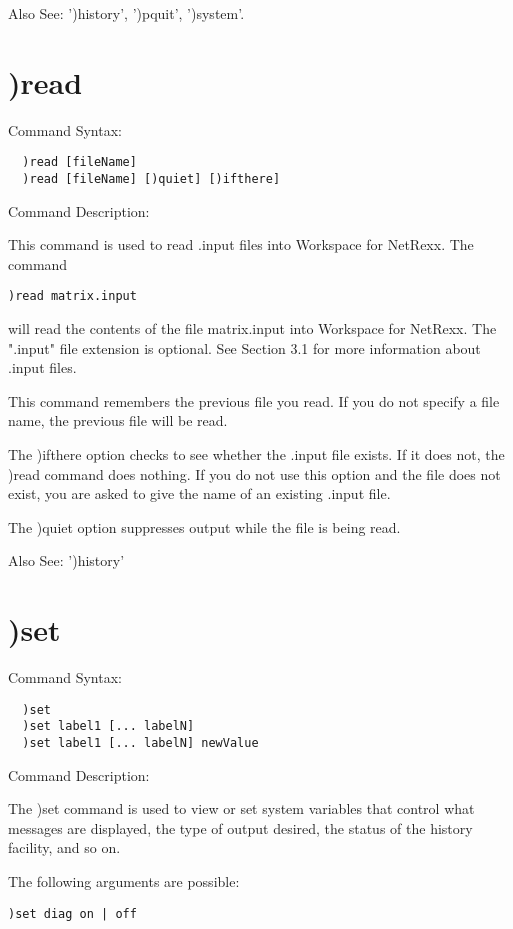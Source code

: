Also See: ')history', ')pquit', ')system'.

\section{)read}

Command Syntax:
\begin{verbatim}
  )read [fileName]
  )read [fileName] [)quiet] [)ifthere]
\end{verbatim}
Command Description:

This command is used to read .input files into Workspace for NetRexx. The command
\begin{verbatim}
)read matrix.input
\end{verbatim}
will read the contents of the file matrix.input into Workspace for NetRexx. The ".input" file extension is optional. See Section 3.1 for more information about .input files.

This command remembers the previous file you read. If you do not specify a file name, the previous file will be read.

The )ifthere option checks to see whether the .input file exists. If it does not, the )read command does nothing. If you do not use this option and the file does not exist, you are asked to give the name of an existing .input file.

The )quiet option suppresses output while the file is being read.

Also See: ')history'

\section{)set}

Command Syntax:
\begin{verbatim}
  )set
  )set label1 [... labelN]
  )set label1 [... labelN] newValue
\end{verbatim}
Command Description:

The )set command is used to view or set system variables that control what messages are displayed, the type of output desired, the status of the history facility, and so on.

The following arguments are possible:
\begin{verbatim}
)set diag on | off
\end{verbatim}

